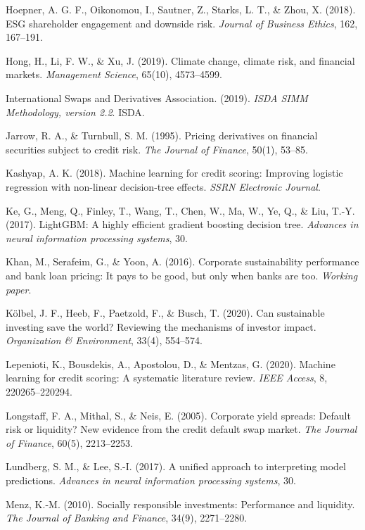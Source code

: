 \begin{thebibliography}{100}
Hoepner, A. G. F., Oikonomou, I., Sautner, Z., Starks, L. T., \& Zhou, X. (2018). ESG shareholder engagement and downside risk. \textit{Journal of Business Ethics}, 162, 167--191.

Hong, H., Li, F. W., \& Xu, J. (2019). Climate change, climate risk, and financial markets. \textit{Management Science}, 65(10), 4573--4599.

International Swaps and Derivatives Association. (2019). \textit{ISDA SIMM Methodology, version 2.2}. ISDA.

Jarrow, R. A., \& Turnbull, S. M. (1995). Pricing derivatives on financial securities subject to credit risk. \textit{The Journal of Finance}, 50(1), 53--85.

Kashyap, A. K. (2018). Machine learning for credit scoring: Improving logistic regression with non-linear decision-tree effects. \textit{SSRN Electronic Journal}.

Ke, G., Meng, Q., Finley, T., Wang, T., Chen, W., Ma, W., Ye, Q., \& Liu, T.-Y. (2017). LightGBM: A highly efficient gradient boosting decision tree. \textit{Advances in neural information processing systems}, 30.

Khan, M., Serafeim, G., \& Yoon, A. (2016). Corporate sustainability performance and bank loan pricing: It pays to be good, but only when banks are too. \textit{Working paper}.

Kölbel, J. F., Heeb, F., Paetzold, F., \& Busch, T. (2020). Can sustainable investing save the world? Reviewing the mechanisms of investor impact. \textit{Organization \& Environment}, 33(4), 554--574.

Lepenioti, K., Bousdekis, A., Apostolou, D., \& Mentzas, G. (2020). Machine learning for credit scoring: A systematic literature review. \textit{IEEE Access}, 8, 220265--220294.

Longstaff, F. A., Mithal, S., \& Neis, E. (2005). Corporate yield spreads: Default risk or liquidity? New evidence from the credit default swap market. \textit{The Journal of Finance}, 60(5), 2213--2253.

Lundberg, S. M., \& Lee, S.-I. (2017). A unified approach to interpreting model predictions. \textit{Advances in neural information processing systems}, 30.

Menz, K.-M. (2010). Socially responsible investments: Performance and liquidity. \textit{The Journal of Banking and Finance}, 34(9), 2271--2280.


\end{thebibliography}
